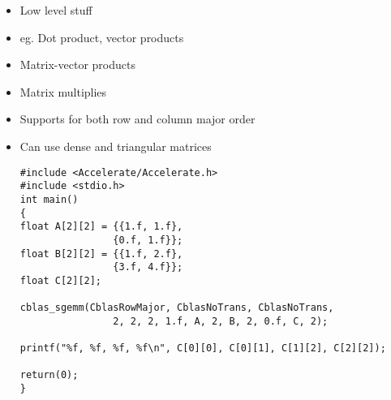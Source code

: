 \begin{itemize}
\item Low level stuff
\item eg. Dot product, vector products
\item Matrix-vector products
\item Matrix multiplies
\item Supports for both row and column major order
\item Can use dense and triangular matrices
\begin{verbatim}
#include <Accelerate/Accelerate.h>
#include <stdio.h>
int main()
{
float A[2][2] = {{1.f, 1.f}, 
		        {0.f, 1.f}};
float B[2][2] = {{1.f, 2.f}, 
		        {3.f, 4.f}};	
float C[2][2];

cblas_sgemm(CblasRowMajor, CblasNoTrans, CblasNoTrans,
    		    2, 2, 2, 1.f, A, 2, B, 2, 0.f, C, 2);	
     		    
printf("%f, %f, %f, %f\n", C[0][0], C[0][1], C[1][2], C[2][2]);

return(0);
}        	        	
\end{verbatim}
\end{itemize}











